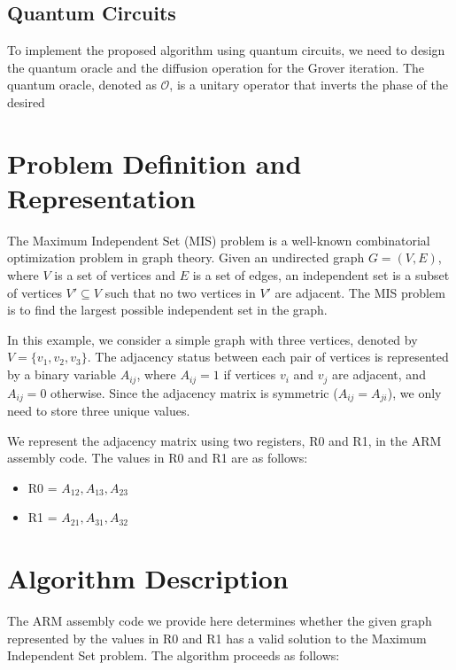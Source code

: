 \subsection{Quantum Circuits}
\label{subsec:circuits}

To implement the proposed algorithm using quantum circuits, we need to design the quantum oracle and the diffusion operation for the Grover iteration. The quantum oracle, denoted as $\mathcal{O}$, is a unitary operator that inverts the phase of the desired

\section{Problem Definition and Representation}

The Maximum Independent Set (MIS) problem is a well-known combinatorial optimization problem in graph theory. Given an undirected graph $G = (V, E)$, where $V$ is a set of vertices and $E$ is a set of edges, an independent set is a subset of vertices $V' \subseteq V$ such that no two vertices in $V'$ are adjacent. The MIS problem is to find the largest possible independent set in the graph.

In this example, we consider a simple graph with three vertices, denoted by $V = \{v_1, v_2, v_3\}$. The adjacency status between each pair of vertices is represented by a binary variable $A_{ij}$, where $A_{ij} = 1$ if vertices $v_i$ and $v_j$ are adjacent, and $A_{ij} = 0$ otherwise. Since the adjacency matrix is symmetric ($A_{ij} = A_{ji}$), we only need to store three unique values.

We represent the adjacency matrix using two registers, R0 and R1, in the ARM assembly code. The values in R0 and R1 are as follows:

\begin{itemize}
    \item R0 = $A_{12}, A_{13}, A_{23}$
    \item R1 = $A_{21}, A_{31}, A_{32}$
\end{itemize}

\section{Algorithm Description}

The ARM assembly code we provide here determines whether the given graph represented by the values in R0 and R1 has a valid solution to the Maximum Independent Set problem. The algorithm proceeds as follows:


